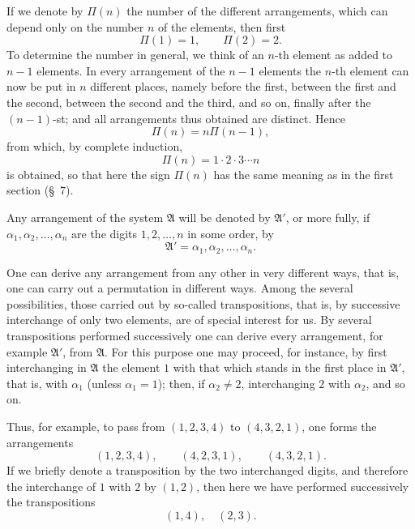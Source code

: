 \documentclass[11pt]{article}
\begin{document}
If we denote by \(\Pi(n)\) the number of the different arrangements, which can depend only on the number \(n\) of the elements, then first
\[
 \Pi(1)=1,\qquad \Pi(2)=2.
\]
To determine the number in general, we think of an \(n\)-th element as added to \(n-1\) elements. In every arrangement of the \(n-1\) elements the \(n\)-th element can now be put in \(n\) different places, namely before the first, between the first and the second, between the second and the third, and so on, finally after the \((n-1)\)-st; and all arrangements thus obtained are distinct. Hence
\begin{equation}
 \Pi(n)=n\Pi(n-1),
\tag{1}
\end{equation}
from which, by complete induction,
\begin{equation}
 \Pi(n)=1\cdot2\cdot3\cdots n
\tag{2}
\end{equation}
is obtained, so that here the sign \(\Pi(n)\) has the same meaning as in the first section (\S~7).

Any arrangement of the system \(\mathfrak A\) will be denoted by \(\mathfrak A'\), or more fully, if \(\alpha_1,\alpha_2,\ldots,\alpha_n\) are the digits \(1,2,\ldots,n\) in some order, by
\begin{equation}
 \mathfrak A'=\alpha_1,\alpha_2,\ldots,\alpha_n.
\tag{3}
\end{equation}

One can derive any arrangement from any other in very different ways, that is, one can carry out a permutation in different ways. Among the several possibilities, those carried out by so-called transpositions, that is, by successive interchange of only two elements, are of special interest for us. By several transpositions performed successively one can derive every arrangement, for example \(\mathfrak A'\), from \(\mathfrak A\). For this purpose one may proceed, for instance, by first interchanging in \(\mathfrak A\) the element \(1\) with that which stands in the first place in \(\mathfrak A'\), that is, with \(\alpha_1\) (unless \(\alpha_1=1\)); then, if \(\alpha_2\ne2\), interchanging \(2\) with \(\alpha_2\), and so on.

Thus, for example, to pass from \((1,2,3,4)\) to \((4,3,2,1)\), one forms the arrangements
\[
 (1,2,3,4),\qquad (4,2,3,1),\qquad (4,3,2,1).
\]
If we briefly denote a transposition by the two interchanged digits, and therefore the interchange of \(1\) with \(2\) by \((1,2)\), then here we have performed successively the transpositions
\[
 (1,4),\quad (2,3).
\]
\end{document}
